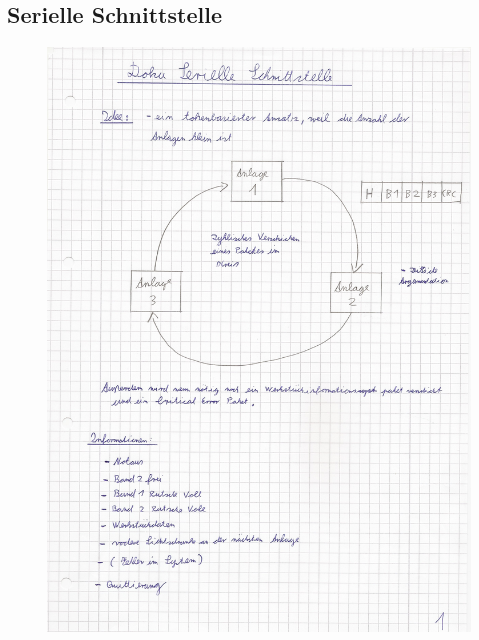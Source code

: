 \documentclass[a4paper, 11pt]{article}
\begin{document}
\subsection{Serielle Schnittstelle}
\begin{figure}[H]
\centering 
    \includegraphics[scale=0.69]{SI/si1.jpg}
    \label{si1}
\end{figure}

\newpage
\end{document}
